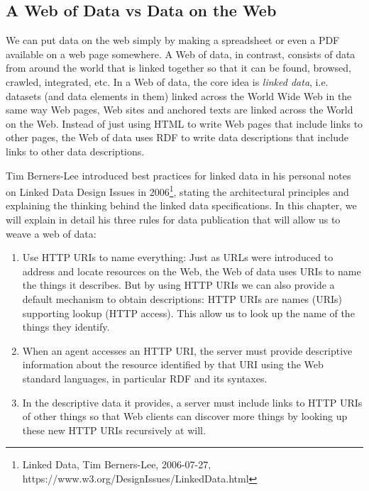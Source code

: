 \subsection{A Web of Data vs Data on the Web}

We can put data on the web simply by making a spreadsheet or even a PDF available on
a web page somewhere.    A Web of data, in contrast, consists of data from around the world that is linked together so that it can be found, browsed,
crawled, integrated, etc. In a Web of data, the core idea is \emph{linked data}, i.e. datasets (and data elements in them)  linked across the
World Wide Web in the same way Web pages, Web sites and anchored texts
are linked across the World on the Web. Instead of just
using HTML to write Web pages that include links to other pages, the Web of
data uses RDF to write data descriptions that include links to other data
descriptions.

Tim Berners-Lee introduced best practices for linked data in his
personal notes on Linked Data Design Issues in 2006\footnote{Linked
  Data, Tim Berners-Lee, 2006-07-27,
  https://www.w3.org/DesignIssues/LinkedData.html}, stating the
architectural principles and explaining the thinking behind the linked data
specifications.   In this chapter, we will explain in detail his three rules 
for data publication that will allow us to weave a web of data:



\begin{enumerate}
\def\labelenumi{\arabic{enumi}.}
\item
\label{ruleURI}
  Use HTTP URIs to name everything: Just as URLs were introduced to
  address and locate resources on the Web, the Web of data uses URIs to
  name the things it describes. But by using HTTP URIs we can also
  provide a default mechanism to obtain descriptions: HTTP URIs are
  names (URIs) supporting lookup (HTTP access). This allow us to
  look up the name of the things they identify.
\item
\label{ruleFYN}
  When an agent accesses an HTTP URI, the server must provide descriptive
  information about the resource identified by that URI using the Web
  standard languages, in particular RDF and its syntaxes.
\item
\label{ruleLink}
  In the descriptive data it provides, a server must include links to
  HTTP URIs of other things so that Web clients can discover more things
  by looking up these new HTTP URIs recursively at will.
\end{enumerate}

